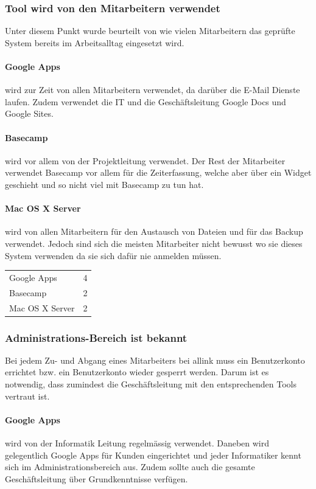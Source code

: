 \subsubsection{Tool wird von den Mitarbeitern verwendet}
\label{ssub:Tool wird von den Mitarbeitern verwendet}
Unter diesem Punkt wurde beurteilt von wie vielen Mitarbeitern das geprüfte System bereits im Arbeitsalltag eingesetzt wird.
\paragraph{Google Apps}
\label{par:1.2Google Apps}
wird zur Zeit von allen Mitarbeitern verwendet, da darüber die E-Mail Dienste laufen. Zudem verwendet die IT und die Geschäftsleitung Google Docs und Google Sites.
\paragraph{Basecamp}
\label{par:1.2Basecamp}
wird vor allem von der Projektleitung verwendet. Der Rest der Mitarbeiter verwendet Basecamp vor allem für die Zeiterfassung, welche aber über ein Widget geschieht und so nicht viel mit Basecamp zu tun hat.
\paragraph{Mac OS X Server}
\label{par:1.2Mac OS X Server}
wird von allen Mitarbeitern für den Austausch von Dateien und für das Backup verwendet. Jedoch sind sich die meisten Mitarbeiter nicht bewusst wo sie dieses System verwenden da sie sich dafür nie anmelden müssen.

\begin{tabular}{lc}
Google Apps & 4\\
Basecamp & 2\\
Mac OS X Server & 2\\
\end{tabular}

\subsubsection{Administrations-Bereich ist bekannt}
\label{ssub:Adminbereich ist bekannt}
Bei jedem Zu- und Abgang eines Mitarbeiters bei allink muss ein Benutzerkonto errichtet bzw. ein Benutzerkonto wieder gesperrt werden. Darum ist es notwendig, dass zumindest die Geschäftsleitung mit den entsprechenden Tools vertraut ist.
\paragraph{Google Apps}
\label{par:1.3Google Apps}
wird von der Informatik Leitung regelmässig verwendet. Daneben wird gelegentlich Google Apps für Kunden eingerichtet und jeder Informatiker kennt sich im Administrationsbereich aus. Zudem sollte auch die gesamte Geschäftsleitung über Grundkenntnisse verfügen.
